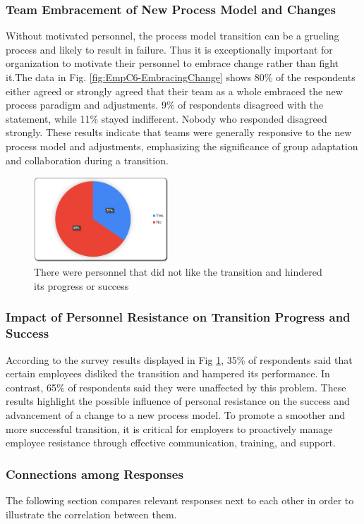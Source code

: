 \documentclass[conference]{IEEEtran}
\begin{document}
\subsubsection{Team Embracement of New Process Model and Changes}
Without motivated personnel, the process model transition can be a grueling process and likely to result in failure. Thus it is exceptionally important for organization to motivate their personnel to embrace change rather than fight it\cite{7496585}.The data in Fig. \ref{fig:EmpC6-EmbracingChange} shows 80\% of the respondents either agreed or strongly agreed that their team as a whole embraced the new process paradigm and adjustments. 9\% of respondents disagreed with the statement, while 11\% stayed indifferent. Nobody who responded disagreed strongly. These results indicate that teams were generally responsive to the new process model and adjustments, emphasizing the significance of group adaptation and collaboration during a transition.
\begin{figure}[H]
    \centering
    \includegraphics[width=0.45\textwidth]{images/EmpC7-Hindrances}
    \caption{There were personnel that did not like the transition and hindered its progress or success}
    \label{fig:EmpC7-Hindrance}
\end{figure}
\subsubsection{Impact of Personnel Resistance on Transition Progress and Success}
According to the survey results displayed in Fig \ref{fig:EmpC7-Hindrance}, 35\% of respondents said that certain employees disliked the transition and hampered its performance. In contrast, 65\% of respondents said they were unaffected by this problem. These results highlight the possible influence of personal resistance on the success and advancement of a change to a new process model. To promote a smoother and more successful transition, it is critical for employers to proactively manage employee resistance through effective communication, training, and support.

\subsubsection{Connections among Responses}
The following section compares relevant responses next to each other in order to illustrate the correlation between them.
\end{document}
